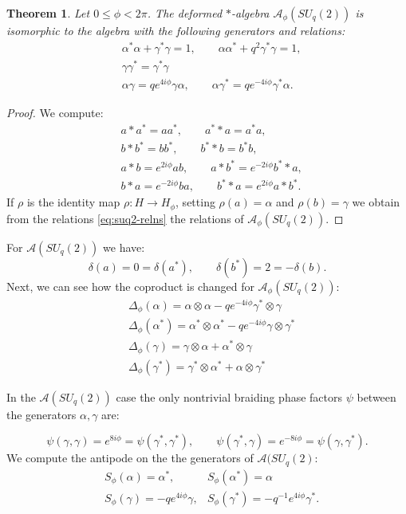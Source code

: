 \documentclass[12pt]{amsart}
\newtheorem{thm}{Theorem}[section]
\theoremstyle{definition}
\numberwithin{equation}{section}
\newcommand{\A}{\mathcal{A}}        %
\begin{document}
\begin{thm}
Let $0 \leq \phi < 2 \pi$. The deformed $\ast$-algebra $\A_\phi(SU_q(2))$
is isomorphic to the algebra with the following generators and relations:
\begin{align}
&\alpha^* \alpha +\gamma^* \gamma= 1, \qquad
\alpha\alpha^*+ q^2 \gamma^* \gamma =1, \\
&\gamma\gamma^*=\gamma^*\gamma \\
&\alpha \gamma = q e^{4 i\phi}\gamma  \alpha , \qquad
\alpha \gamma^*  = q e^{-4 i \phi} \gamma^* \alpha .
\end{align}
\end{thm}
\begin{proof}
We compute:
$$
\begin{aligned}
& a \ast a^* = a a^*, \qquad a^* \ast a = a^* a, \\
& b \ast b^* = bb^*, \qquad  b^* \ast b = b^*b, \\
& a \ast b =  e^{2 i \phi} ab, \qquad 
  a \ast b^* = e^{-2 i \phi} b^* \ast a, \\
& b \ast a =  e^{-2 i \phi} ba, \qquad 
  b^* \ast a = e^{2 i \phi} a \ast b^*.
\end{aligned}
$$
If $\rho$ is the identity map $\rho: H \to H_\phi$, setting $\rho(a) = \alpha$ and 
$\rho(b) = \gamma$ we obtain from the relations \ref{eq:suq2-relns} the relations 
of $\A_\phi(SU_q(2))$.
\end{proof}
For $\A(SU_q(2))$ we have:
$$ \delta(a) = 0 = \delta(a^*), \qquad \delta(b^*) = 2 = - \delta(b).$$
Next, we can see how the coproduct is changed for $\A_\phi(SU_q(2))$:
\begin{align}
&\Delta_\phi(\alpha)=\alpha \otimes \alpha - 
 q e^{-4i\phi} \gamma^*\otimes \gamma\\
&\Delta_\phi(\alpha^*)=\alpha^*\otimes \alpha^* - 
 q e^{-4i \phi} \gamma \otimes \gamma^*\\
&\Delta_\phi(\gamma)=\gamma\otimes\alpha +\alpha^*\otimes \gamma \\
&\Delta_\phi(\gamma^*)=\gamma^*\otimes \alpha^*+\alpha\otimes \gamma^*
\end{align}

In the $\A(SU_q(2))$ case the only nontrivial braiding phase factors $\psi$ between the generators $\alpha, \gamma$ are:

$$ \psi(\gamma, \gamma) = e^{8 i \phi} = \psi(\gamma^*, \gamma^*), \qquad
   \psi(\gamma^*, \gamma) = e^{-8 i \phi} = \psi(\gamma, \gamma^*).
$$ 
We compute the antipode on the the generators of $\A(SU_q(2)$: 
\begin{align}
&S_{\phi}(\alpha)=\alpha^*, \qquad &S_{\phi}(\alpha^*)=\alpha \\
&S_{\phi}(\gamma)= - q e^{ 4i\phi} \gamma, &S_{\phi}(\gamma^*)= - q^{-1} e^{ 4i\phi}  \gamma^*. 
\end{align}
\end{document}
